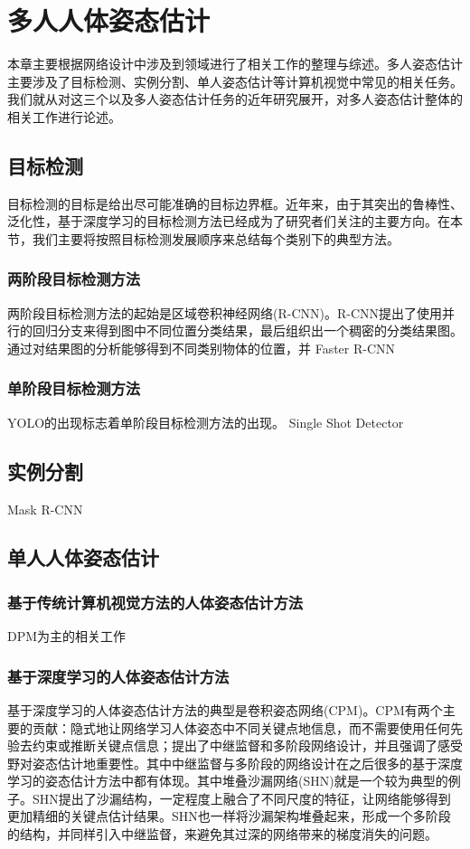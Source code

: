 \chapter{多人人体姿态估计}
\label{cha:related}
本章主要根据网络设计中涉及到领域进行了相关工作的整理与综述。多人姿态估计主要涉及了目标检测、实例分割、单人姿态估计等计算机视觉中常见的相关任务。我们就从对这三个以及多人姿态估计任务的近年研究展开，对多人姿态估计整体的相关工作进行论述。
\section{目标检测}
\label{sec:detect}
目标检测的目标是给出尽可能准确的目标边界框。近年来，由于其突出的鲁棒性、泛化性，基于深度学习的目标检测方法已经成为了研究者们关注的主要方向。在本节，我们主要将按照目标检测发展顺序来总结每个类别下的典型方法。
\subsection{两阶段目标检测方法}
\label{2stagedetector}
两阶段目标检测方法的起始是区域卷积神经网络(R-CNN)\cite{Girshick_2014_CVPR}。R-CNN提出了使用并行的回归分支来得到图中不同位置分类结果，最后组织出一个稠密的分类结果图。通过对结果图的分析能够得到不同类别物体的位置，并
Faster R-CNN
\subsection{单阶段目标检测方法}
\label{subsec:1stagedetector}
YOLO\cite{redmon2016you}的出现标志着单阶段目标检测方法的出现。
Single Shot Detector

\section{实例分割}
\label{sec:insseg}
Mask R-CNN

\section{单人人体姿态估计}
\label{sec:singlepose}
\subsection{基于传统计算机视觉方法的人体姿态估计方法}
\label{subsec:legacypose}
DPM为主的相关工作
\subsection{基于深度学习的人体姿态估计方法}
\label{subsec:deeppose}
基于深度学习的人体姿态估计方法的典型是卷积姿态网络(CPM)\cite{wei2016convolutional}。CPM有两个主要的贡献：隐式地让网络学习人体姿态中不同关键点地信息，而不需要使用任何先验去约束或推断关键点信息；提出了中继监督和多阶段网络设计，并且强调了感受野对姿态估计地重要性。其中中继监督与多阶段的网络设计在之后很多的基于深度学习的姿态估计方法中都有体现。其中堆叠沙漏网络(SHN)\cite{newell2016stacked}就是一个较为典型的例子。SHN提出了沙漏结构，一定程度上融合了不同尺度的特征，让网络能够得到更加精细的关键点估计结果。SHN也一样将沙漏架构堆叠起来，形成一个多阶段的结构，并同样引入中继监督，来避免其过深的网络带来的梯度消失的问题。

